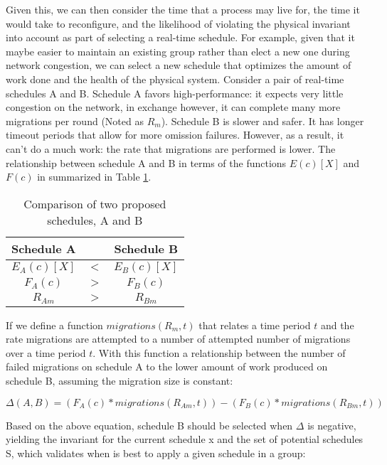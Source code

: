 Given this, we can then consider the time that a process may live for, the time it would take to reconfigure, and the likelihood of violating the physical invariant into account as part of selecting a real-time schedule.
For example, given that it maybe easier to maintain an existing group rather than elect a new one during network congestion, we can select a new schedule that optimizes the amount of work done and the health of the physical system.
Consider a pair of real-time schedules A and B.
Schedule A favors high-performance: it expects very little congestion on the network, in exchange however, it can complete many more migrations per round (Noted as $R_{m}$).
Schedule B is slower and safer.
It has longer timeout periods that allow for more omission failures.
However, as a result, it can't do a much work: the rate that migrations are performed is lower.
The relationship between schedule A and B in terms of the functions $E(c)[X]$ and $F(c)$ in summarized in Table \ref{tab:SCHED-COMPARE}.

\begin{table}
\caption{Comparison of two proposed schedules, A and B}
\label{tab:SCHED-COMPARE}
\centering
\begin{tabular}{ c  c  c }
Schedule A & & Schedule B \\ \hline
$E_{A}(c)[X]$ & $<$ & $E_{B}(c)[X]$ \\
$F_{A}(c)$ & $>$ & $F_{B}(c)$ \\ 
$R_{Am}$ & $>$ & $R_{Bm}$ \\ 
\end{tabular}
\end{table}

If we define a function $migrations(R_{m},t)$ that relates a time period $t$ and the rate migrations are attempted to a number of attempted number of migrations over a time period $t$.
With this function a relationship between the number of failed migrations on schedule A to the lower amount of work produced on schedule B, assuming the migration size is constant:

\begin{equation}
\Delta(A,B) = (F_{A}(c) * migrations(R_{Am},t)) - (F_{B}(c) * migrations(R_{Bm},t))
\end{equation}

Based on the above equation, schedule B should be selected when $\Delta$ is negative, yielding the invariant for the current schedule x and the set of potential schedules S, which validates when is best to apply
a given schedule in a group:

